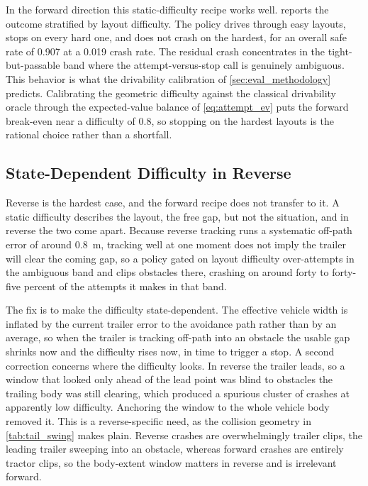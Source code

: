 In the forward direction this static-difficulty recipe works well.  reports the outcome stratified by layout difficulty. The policy drives through easy layouts, stops on every hard one, and does not crash on the hardest, for an overall safe rate of 0.907 at a 0.019 crash rate. The residual crash concentrates in the tight-but-passable band where the attempt-versus-stop call is genuinely ambiguous. This behavior is what the drivability calibration of \cref{sec:eval_methodology} predicts. Calibrating the geometric difficulty against the classical drivability oracle through the expected-value balance of \cref{eq:attempt_ev} puts the forward break-even near a difficulty of $0.8$, so stopping on the hardest layouts is the rational choice rather than a shortfall.



\subsection{State-Dependent Difficulty in Reverse}

Reverse is the hardest case, and the forward recipe does not transfer to it. A static difficulty describes the layout, the free gap, but not the situation, and in reverse the two come apart. Because reverse tracking runs a systematic off-path error of around $0.8$~m, tracking well at one moment does not imply the trailer will clear the coming gap, so a policy gated on layout difficulty over-attempts in the ambiguous band and clips obstacles there, crashing on around forty to forty-five percent of the attempts it makes in that band.

The fix is to make the difficulty state-dependent. The effective vehicle width is inflated by the current trailer error to the avoidance path rather than by an average, so when the trailer is tracking off-path into an obstacle the usable gap shrinks now and the difficulty rises now, in time to trigger a stop. A second correction concerns where the difficulty looks. In reverse the trailer leads, so a window that looked only ahead of the lead point was blind to obstacles the trailing body was still clearing, which produced a spurious cluster of crashes at apparently low difficulty. Anchoring the window to the whole vehicle body removed it. This is a reverse-specific need, as the collision geometry in \cref{tab:tail_swing} makes plain. Reverse crashes are overwhelmingly trailer clips, the leading trailer sweeping into an obstacle, whereas forward crashes are entirely tractor clips, so the body-extent window matters in reverse and is irrelevant forward.

